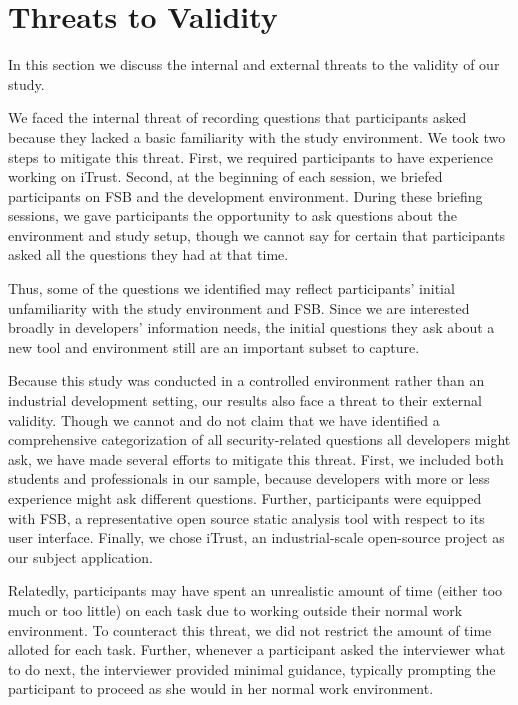 \documentclass[10pt,journal,compsoc]{IEEEtran}
\begin{document}



\section{Threats to Validity}
\label{limits}
In this section we discuss the internal and external threats to the validity of our study.

We faced the internal threat of recording questions that participants asked because they lacked a basic familiarity with the study environment. 
We took two steps to mitigate this threat.
First, we required participants to have experience working on iTrust.
Second, at the  beginning of each session, we briefed participants on FSB and the development environment. 
During these briefing sessions, we gave participants the opportunity to ask questions about the environment and study setup, though we cannot say for certain that participants asked all the questions they had at that time.

Thus, some of the questions we identified may reflect participants' initial unfamiliarity with the study environment and FSB.
Since we are interested broadly in developers' information needs, the initial questions they ask about a new tool and environment still are an important subset to capture.

Because this study was conducted in a controlled environment rather than an industrial development setting, our results also face a threat to their external validity. 
Though we cannot and do not claim that we have identified a comprehensive categorization of all security-related questions all developers might ask, we have made several efforts to mitigate this threat.
First, we included both students and professionals in our sample, because developers with more or less experience might ask different questions. 
Further, participants were equipped with FSB, a representative open source static analysis tool with respect to its user interface.
Finally, we chose iTrust, an industrial-scale open-source project as our subject application.

Relatedly, participants may have spent an unrealistic amount of time (either too much or too little) on each task due to working outside their normal work environment.
To counteract this threat, we did not restrict the amount of time alloted for each task.
Further, whenever a participant asked the interviewer what to do next, the interviewer provided minimal guidance, typically prompting the participant to proceed as she would in her normal work environment.
\end{document}
